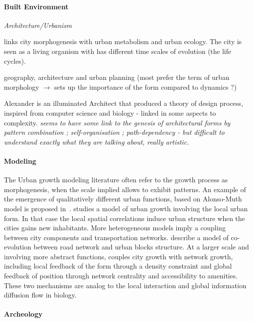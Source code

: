 \documentclass{article}
\begin{document}
\paragraph{Built Environment}

\textit{Architecture/Urbanism}

\cite{olsen1982urban} links city morphogenesis with urban metabolism and urban ecology. The city is seen as a living organism with has different time scales of evolution (the life cycles).

\cite{moudon1997urban} geography, architecture and urban planning (most prefer the term of urban morphology $\rightarrow$ sets up the importance of the form compared to dynamics ?)

\cite{mehaffy2007notes} Alexander is an illuminated Architect that produced a theory of design process, inspired from computer science and biology - linked in some aspects to complexity. \textit{seems to have some link to the genesis of architectural forms by pattern combination ; self-organisation ; path-dependency - but difficult to understand exactly what they are talking about, really artistic.}


\paragraph{Modeling}

The Urban growth modeling literature often refer to the growth process as morphogenesis, when the scale implied allows to exhibit patterns. An example of the emergence of qualitatively different urban functions, based on Alonso-Muth model is proposed in~\cite{bonin2012modele}. \cite{makse1998modeling} studies a model of urban growth involving the local urban form. In that case the local spatial correlations induce urban structure when the cities gains new inhabitants. More heterogeneous models imply a coupling between city components and transportation networks. \cite{achibet2014model} describe a model of co-evolution between road network and urban blocks structure. At a larger scale and involving more abstract functions, \cite{raimbault2014hybrid} couples city growth with network growth, including local feedback of the form through a density constraint and global feedback of position through network centrality and accessibility to amenities. These two mechanisms are analog to the local interaction and global information diffusion flow in biology.

\paragraph{Archeology}
\end{document}
